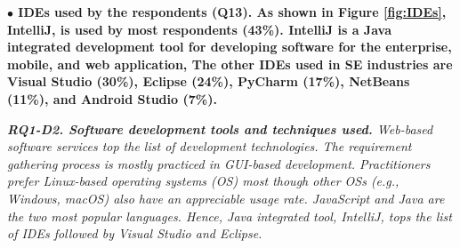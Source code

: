 
\nd\bf{$\bullet$ IDEs used by the respondents (Q13).} As shown in Figure \ref{fig:IDEs},
IntelliJ, is used by most respondents (43\%). IntelliJ is a Java integrated development tool for developing software for the
enterprise, mobile, and web application, The
other IDEs used in SE industries are Visual Studio (30\%), Eclipse (24\%),
PyCharm (17\%), NetBeans (11\%), and Android Studio (7\%).


\begin{tcolorbox}[flushleft upper,boxrule=1pt,arc=0pt,left=0pt,right=0pt,top=0pt,bottom=0pt,colback=white,after=\ignorespacesafterend\par\noindent]
\nd\it{\bf{RQ1-D2. Software development tools and techniques used.}} Web-based
software services top the list of development technologies. The requirement
gathering process is mostly practiced in GUI-based development. Practitioners prefer Linux-based operating
systems (OS) most though other OSs (e.g., Windows, macOS)
also have an appreciable usage rate. JavaScript and Java are the two most
popular languages. Hence, Java integrated tool,
IntelliJ, tops the list of IDEs followed by Visual Studio and Eclipse.
\end{tcolorbox}
